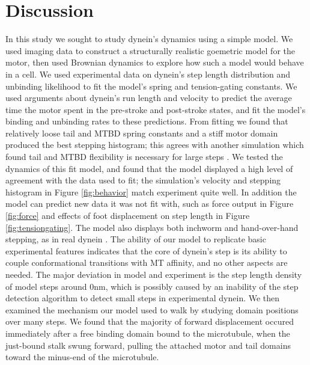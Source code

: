 \documentclass[9pt,twocolumn,twoside]{article}
\begin{document}

\section{Discussion}
In this study we sought to study dynein's dynamics using a simple model. We used imaging data to construct a structurally realistic goemetric model for the motor, then used Brownian dynamics to explore how such a model would behave in a cell. We used experimental data on dynein's step length distribution and unbinding likelihood to fit the model's spring and tension-gating constants. We used arguments about dynein's run length and velocity to predict the average time the motor spent in the pre-stroke and post-stroke states, and fit the model's binding and unbinding rates to these predictions. From fitting we found that relatively loose tail and MTBD spring constants and a stiff motor domain produced the best stepping histogram; this agrees with another simulation which found tail and MTBD flexibility is necessary for large steps \cite{tsygankovemsimulation}. We tested the dynamics of this fit model, and found that the model displayed a high level of agreement with the data used to fit; the simulation's velocity and stepping histogram in Figure \ref{fig:behavior} match experiment quite well. In addition the model can predict new data it was not fit with, such as force output in Figure \ref{fig:force} and effects of foot displacement on step length in Figure \ref{fig:tensiongating}. The model also displays both inchworm and hand-over-hand stepping, as in real dynein \cite{weihongpaper}. The ability of our model to replicate basic experimental features indicates that the core of dynein's step is its ability to couple conformational transitions with MT affinity, and no other aspects are needed. The major deviation in model and experiment is the step length density of model steps around 0nm, which is possibly caused by an inability of the step detection algorithm to detect small steps in experimental dynein. We then examined the mechanism our model used to walk by studying domain positions over many steps. We found that the majority of forward displacement occured immediately after a free binding domain bound to the microtubule, when the just-bound stalk swung forward, pulling the attached motor and tail domains toward the minus-end of the microtubule.
\end{document}
